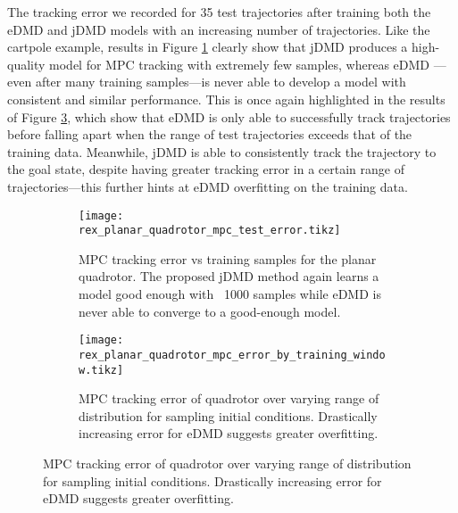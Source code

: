 \documentclass{article}
\begin{document}
The tracking error we recorded for 35 test trajectories after training both the eDMD 
and jDMD models with an increasing number of trajectories. Like the cartpole example,
results in Figure \ref{fig:rex_planar_quadrotor_mpc_test_error} clearly show that jDMD
produces a high-quality model for MPC tracking with extremely few samples, whereas eDMD
---even after many training samples---is never able to develop a model with consistent
and similar performance. This is once again highlighted
in the results of Figure \ref{fig:rex_planar_quadrotor_mpc_error_by_training_window}, which
show that eDMD is only able to successfully track trajectories before falling apart when the
range of test trajectories exceeds that of the training data. Meanwhile, jDMD is able to consistently
track the trajectory to the goal state, despite having greater tracking error in a certain range
of trajectories---this further hints at eDMD overfitting on the training data.

\begin{figure}[t]
    \centering
    \begin{subfigure}[t]{0.48\textwidth}
        \raggedleft
        \texttt{[image: rex\_planar\_quadrotor\_mpc\_test\_error.tikz]}
        \caption{MPC tracking error vs training samples for the planar quadrotor. The proposed jDMD method again learns a model good enough with ~1000 samples while eDMD is never able to converge to a good-enough model.}
        \label{fig:rex_planar_quadrotor_mpc_test_error}
    \end{subfigure}
    \hfill
    \begin{subfigure}[t]{0.48\textwidth}
        \raggedright
        \texttt{[image: rex\_planar\_quadrotor\_mpc\_error\_by\_training\_window.tikz]}
        \caption{MPC tracking error of quadrotor over varying range of distribution for sampling initial conditions. Drastically increasing error for eDMD suggests greater overfitting.}
        \label{fig:rex_planar_quadrotor_mpc_error_by_training_window}
    \end{subfigure}
\end{figure}

\end{document}
